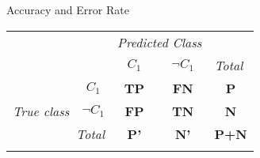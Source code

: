 \begin{frame}{Accuracy and Error Rate}

	\vspace*{-1.5em}

	\begin{center}
		\begin{tabular}{lp{1cm}p{1cm}p{1cm}p{1cm}}
			                                                           &                                                                & \multicolumn{2}{c}{\textit{Predicted Class}}              & \multicolumn{1}{l}{}                                                                                \\ \cline{3-4}
			                                                           & \multicolumn{1}{l|}{}                                          & \multicolumn{1}{c|}{\cellcolor{faugray!62}\textbf{$C_1$}} & \multicolumn{1}{c|}{\cellcolor{faugray!62}\textbf{$\neg C_1$}} & \multicolumn{1}{l}{\textit{Total}} \\ \cline{2-5}
			\multicolumn{1}{c|}{}                                      & \multicolumn{1}{c|}{\cellcolor{faugray!62}\textbf{$C_1$}}      & \multicolumn{1}{c|}{\textbf{TP}}                          & \multicolumn{1}{c|}{\textbf{FN}}                               & \multicolumn{1}{c}{\textbf{P}}     \\ \cline{2-4}
			\multicolumn{1}{c|}{\multirow{-2}{*}{\textit{True class}}} & \multicolumn{1}{c|}{\cellcolor{faugray!62}\textbf{$\neg C_1$}} & \multicolumn{1}{c|}{\textbf{FP}}                          & \multicolumn{1}{c|}{\textbf{TN}}                               & \multicolumn{1}{c}{\textbf{N}}     \\ \cline{2-5}
			\multicolumn{2}{r|}{\textit{Total}}                        & \multicolumn{1}{c}{\textbf{P'}}                                & \multicolumn{1}{c|}{\textbf{N'}}                          & \multicolumn{1}{c}{\textbf{P+N}}                                                                    \\
			                                                           &                                                                &                                                           &                                                                &
		\end{tabular}
	\end{center}

	\vspace*{-0.5cm}


\end{frame}
